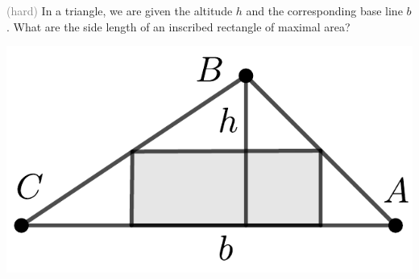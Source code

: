 \begin{minipage}{0.7\textwidth}
\begin{exercise}
	\textcolor{gray}{(hard)} In a triangle, we are given the altitude $h$ and the corresponding base line $b$.
	What are the side length of an inscribed rectangle of maximal area?
\end{exercise}
\end{minipage}\hfill
\begin{minipage}{0.25\textwidth}
	\includegraphics[width=\textwidth]{images/triangle}
\end{minipage}\\